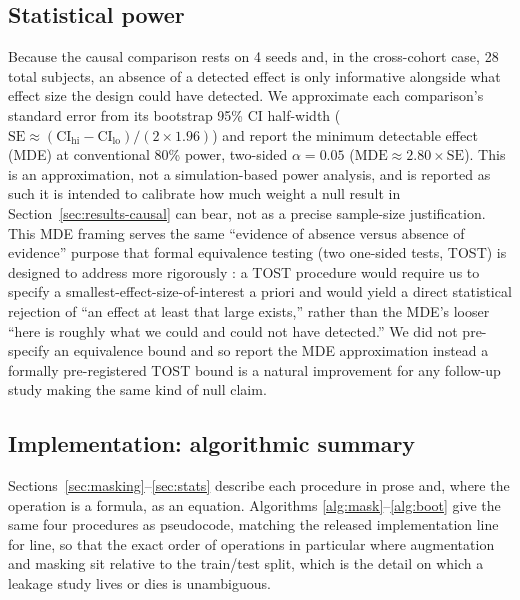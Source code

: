 \documentclass[3p,final,10pt]{elsarticle}
\let\oldsubsection\subsection
\renewcommand{\subsection}{\FloatBarrier\oldsubsection}
\begin{document}
\subsection{Statistical power}
\label{sec:power}
Because the causal comparison rests on 4 seeds and, in the cross-cohort
case, 28 total subjects, an absence of a detected effect is only
informative alongside what effect size the design could have detected. We
approximate each comparison's standard error from its bootstrap 95\% CI
half-width ($\mathrm{SE}\approx(\mathrm{CI}_{\mathrm{hi}}-\mathrm{CI}_{\mathrm{lo}})/(2\times1.96)$)
and report the minimum detectable effect (MDE) at conventional 80\% power,
two-sided $\alpha=0.05$ ($\mathrm{MDE}\approx2.80\times\mathrm{SE}$). This
is an approximation, not a simulation-based power analysis, and is
reported as such it is intended to calibrate how much weight a null
result in Section~\ref{sec:results-causal} can bear, not as a precise
sample-size justification. This MDE framing serves the same ``evidence of
absence versus absence of evidence'' purpose that formal equivalence
testing (two one-sided tests, TOST) is designed to address more
rigorously \cite{lakens2017}: a TOST procedure would require us to specify
a smallest-effect-size-of-interest a priori and would yield a direct
statistical rejection of ``an effect at least that large exists,'' rather
than the MDE's looser ``here is roughly what we could and could not have
detected.'' We did not pre-specify an equivalence bound and so report the
MDE approximation instead a formally pre-registered TOST bound is a
natural improvement for any follow-up study making the same kind of null
claim.

\subsection{Implementation: algorithmic summary}
\label{sec:implementation}
Sections~\ref{sec:masking}--\ref{sec:stats} describe each procedure in
prose and, where the operation is a formula, as an equation. Algorithms
\ref{alg:mask}--\ref{alg:boot} give the same four procedures as pseudocode,
matching the released implementation line for line, so that the exact
order of operations in particular where augmentation and masking
sit relative to the train/test split, which is the detail on which a
leakage study lives or dies is unambiguous.
\end{document}
